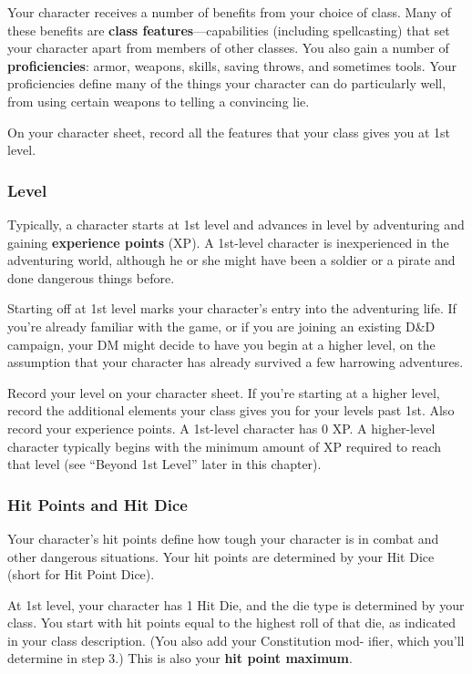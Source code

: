 Your character receives a number of benefits from your choice of class. Many of these benefits are \textbf{class features}—capabilities (including spellcasting) that set your character apart from members of other classes. You also gain a number of \textbf{proficiencies}: armor, weapons, skills, saving throws, and sometimes tools. Your proficiencies define many of the things your character can do particularly well, from using certain weapons to telling a convincing lie.

On your character sheet, record all the features that your class gives you at 1st level.

\subsubsection{Level}
Typically, a character starts at 1st level and advances in level by adventuring and gaining \textbf{experience points} (XP). A 1st-level character is inexperienced in the adventuring world, although he or she might have been a soldier or a pirate and done dangerous things before.

Starting off at 1st level marks your character’s entry into the adventuring life. If you’re already familiar with the game, or if you are joining an existing D\&D campaign, your DM might decide to have you begin at a higher level, on the assumption that your character has already survived a few harrowing adventures.

Record your level on your character sheet. If you’re starting at a higher level, record the additional elements your class gives you for your levels past 1st. Also record your experience points. A 1st-level character has
0 XP. A higher-level character typically begins with the minimum amount of XP required to reach that level (see “Beyond 1st Level” later in this chapter).

\subsubsection{Hit Points and Hit Dice}
Your character’s hit points define how tough your character is in combat and other dangerous situations. Your hit points are determined by your Hit Dice (short for Hit Point Dice).

At 1st level, your character has 1 Hit Die, and the die type is determined by your class. You start with hit points equal to the highest roll of that die, as indicated in your class description. (You also add your Constitution mod- ifier, which you’ll determine in step 3.) This is also your \textbf{hit point maximum}.

